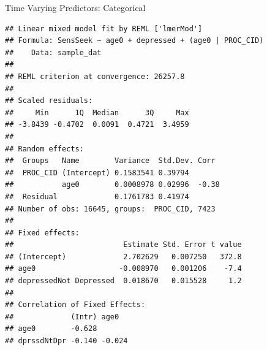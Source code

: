 \documentclass[ignorenonframetext,]{beamer}
\newenvironment{Shaded}{\begin{snugshade}}{\end{snugshade}}
\newcommand{\KeywordTok}[1]{\textcolor[rgb]{0.13,0.29,0.53}{\textbf{{#1}}}}
\newcommand{\DataTypeTok}[1]{\textcolor[rgb]{0.13,0.29,0.53}{{#1}}}
\newcommand{\DecValTok}[1]{\textcolor[rgb]{0.00,0.00,0.81}{{#1}}}
\newcommand{\FloatTok}[1]{\textcolor[rgb]{0.00,0.00,0.81}{{#1}}}
\newcommand{\StringTok}[1]{\textcolor[rgb]{0.31,0.60,0.02}{{#1}}}
\newcommand{\CommentTok}[1]{\textcolor[rgb]{0.56,0.35,0.01}{\textit{{#1}}}}
\newcommand{\NormalTok}[1]{{#1}}
\begin{document}
\begin{frame}[fragile]{Time Varying Predictors: Categorical}

\small

\begin{Shaded}
\end{Shaded}

\tiny

\begin{verbatim}
## Linear mixed model fit by REML ['lmerMod']
## Formula: SensSeek ~ age0 + depressed + (age0 | PROC_CID)
##    Data: sample_dat
## 
## REML criterion at convergence: 26257.8
## 
## Scaled residuals: 
##     Min      1Q  Median      3Q     Max 
## -3.8439 -0.4702  0.0091  0.4721  3.4959 
## 
## Random effects:
##  Groups   Name        Variance  Std.Dev. Corr 
##  PROC_CID (Intercept) 0.1583541 0.39794       
##           age0        0.0008978 0.02996  -0.38
##  Residual             0.1761783 0.41974       
## Number of obs: 16645, groups:  PROC_CID, 7423
## 
## Fixed effects:
##                         Estimate Std. Error t value
## (Intercept)             2.702629   0.007250   372.8
## age0                   -0.008970   0.001206    -7.4
## depressedNot Depressed  0.018670   0.015528     1.2
## 
## Correlation of Fixed Effects:
##             (Intr) age0  
## age0        -0.628       
## dprssdNtDpr -0.140 -0.024
\end{verbatim}

\normalsize

\end{frame}
\end{document}
